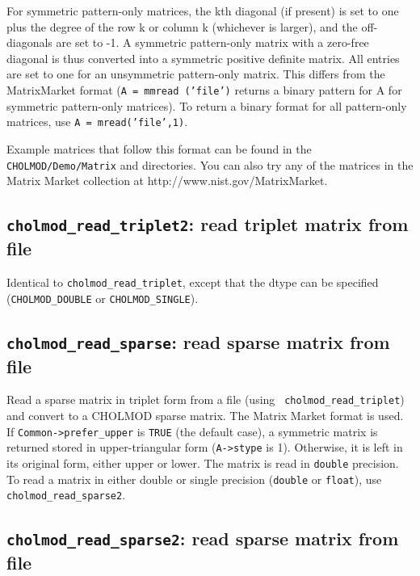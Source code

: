 \documentclass[11pt]{article}
\begin{document}
For symmetric pattern-only matrices, the kth diagonal (if present) is set to
one plus the degree of the row k or column k (whichever is larger), and the
off-diagonals are set to -1.  A symmetric pattern-only matrix with a zero-free
diagonal is thus converted into a symmetric positive definite matrix.  All
entries are set to one for an unsymmetric pattern-only matrix.  This differs
from the MatrixMarket format ({\tt A = mmread ('file')} returns a binary
pattern for A for symmetric pattern-only matrices).  To return a binary format
for all pattern-only matrices, use {\tt A = mread('file',1)}.

Example matrices that follow this format can be found in the {\tt
CHOLMOD/Demo/Matrix} and  directories.  You
can also try any of the matrices in the Matrix Market collection at
http://www.nist.gov/MatrixMarket.

\subsection{{\tt cholmod\_read\_triplet2}: read triplet matrix from file}


Identical to \verb'cholmod_read_triplet', except that the dtype can be
specified (\verb'CHOLMOD_DOUBLE' or \verb'CHOLMOD_SINGLE').

\subsection{{\tt cholmod\_read\_sparse}: read sparse matrix from file}


Read a sparse matrix in triplet form from a file (using {\tt
cholmod\_read\_triplet}) and convert to a CHOLMOD sparse matrix.  The Matrix
Market format is used.  If {\tt Common->prefer\_upper} is {\tt TRUE} (the
default case), a symmetric matrix is returned stored in upper-triangular form
({\tt A->stype} is 1).  Otherwise, it is left in its original form, either
upper or lower.
%
The matrix is read in {\tt double} precision.  To read a matrix
in either double or single precision ({\tt double} or {\tt float}),
use \verb'cholmod_read_sparse2'.

\subsection{{\tt cholmod\_read\_sparse2}: read sparse matrix from file}
\end{document}
